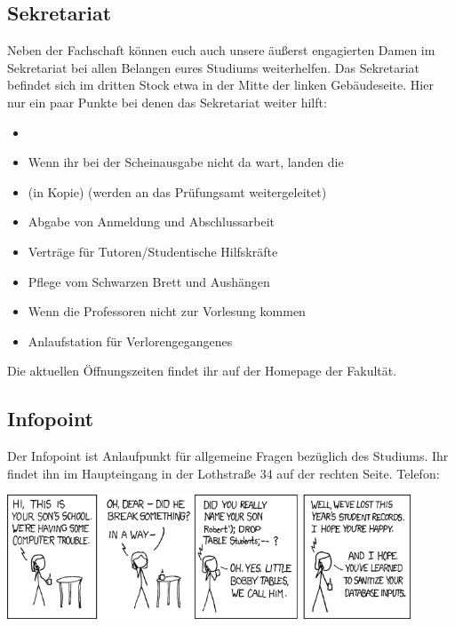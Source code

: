 \subsection{Sekretariat}
Neben der Fachschaft können euch auch unsere äußerst engagierten 
Damen im Sekretariat bei allen Belangen eures Studiums weiterhelfen. 
Das Sekretariat befindet sich im dritten Stock etwa in der Mitte der 
linken Gebäudeseite.\doublebreak
Hier nur ein paar Punkte bei denen das Sekretariat weiter hilft:
\begin{itemize}
	\item {} 
	\item Wenn ihr bei der Scheinausgabe nicht da wart, landen die 	
	\item {} (in Kopie) (werden an das Prüfungsamt weitergeleitet) 
	\item Abgabe von Anmeldung und Abschlussarbeit 
	\item Verträge für Tutoren/Studentische Hilfskräfte 
	\item Pflege vom Schwarzen Brett und Aushängen 
	\item Wenn die Professoren nicht zur Vorlesung kommen
	\item Anlaufstation für Verlorengegangenes
\end{itemize}
Die aktuellen Öffnungszeiten findet ihr auf der Homepage der Fakultät. 

\subsection{Infopoint}
Der Infopoint ist Anlaufpunkt für allgemeine Fragen bezüglich des 
Studiums. Ihr findet ihn im Haupteingang in der Lothstraße 34 auf der 
rechten Seite. Telefon: \\
\begin{center}
	\includegraphics[width=12cm]{inputs/Bilder/name_of_son.png}
\end{center}

